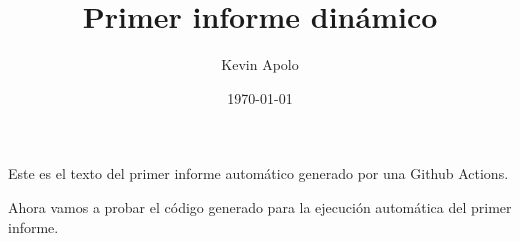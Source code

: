 \documentclass[12pt, a4paper]{book}
\title{Primer informe dinámico}
\author{Kevin Apolo}
\date{\today}
\begin{document}
\maketitle

Este es el texto del primer informe automático generado por una Github Actions.\newline

Ahora vamos a probar el código generado para la ejecución automática del primer informe.
\end{document}
